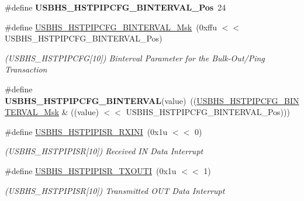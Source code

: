 \begin{DoxyCompactItemize}
\mbox{\label{group__SAME70__USBHS_ga296398192bdd3d809eaa7b87256f23de}} 
\#define {\bfseries U\+S\+B\+H\+S\+\_\+\+H\+S\+T\+P\+I\+P\+C\+F\+G\+\_\+\+B\+I\+N\+T\+E\+R\+V\+A\+L\+\_\+\+Pos}~24
\item 
\mbox{\label{group__SAME70__USBHS_gaedc9c4e67bfc7cc3d61e05ad12d33253}} 
\#define \mbox{\hyperlink{group__SAME70__USBHS_gaedc9c4e67bfc7cc3d61e05ad12d33253}{U\+S\+B\+H\+S\+\_\+\+H\+S\+T\+P\+I\+P\+C\+F\+G\+\_\+\+B\+I\+N\+T\+E\+R\+V\+A\+L\+\_\+\+Msk}}~(0xffu $<$$<$ U\+S\+B\+H\+S\+\_\+\+H\+S\+T\+P\+I\+P\+C\+F\+G\+\_\+\+B\+I\+N\+T\+E\+R\+V\+A\+L\+\_\+\+Pos)
\begin{DoxyCompactList}\small\item\em (U\+S\+B\+H\+S\+\_\+\+H\+S\+T\+P\+I\+P\+C\+FG\mbox{[}10\mbox{]}) Binterval Parameter for the Bulk-\/\+Out/\+Ping Transaction \end{DoxyCompactList}\item 
\mbox{\label{group__SAME70__USBHS_ga9dfcf332f4e592710da5e84377e52306}} 
\#define {\bfseries U\+S\+B\+H\+S\+\_\+\+H\+S\+T\+P\+I\+P\+C\+F\+G\+\_\+\+B\+I\+N\+T\+E\+R\+V\+AL}(value)~((\mbox{\hyperlink{group__SAMV71__USBHS_gaedc9c4e67bfc7cc3d61e05ad12d33253}{U\+S\+B\+H\+S\+\_\+\+H\+S\+T\+P\+I\+P\+C\+F\+G\+\_\+\+B\+I\+N\+T\+E\+R\+V\+A\+L\+\_\+\+Msk}} \& ((value) $<$$<$ U\+S\+B\+H\+S\+\_\+\+H\+S\+T\+P\+I\+P\+C\+F\+G\+\_\+\+B\+I\+N\+T\+E\+R\+V\+A\+L\+\_\+\+Pos)))
\item 
\mbox{\label{group__SAME70__USBHS_gabd4bff53529d3a63d2f2a6b288ea4404}} 
\#define \mbox{\hyperlink{group__SAME70__USBHS_gabd4bff53529d3a63d2f2a6b288ea4404}{U\+S\+B\+H\+S\+\_\+\+H\+S\+T\+P\+I\+P\+I\+S\+R\+\_\+\+R\+X\+I\+NI}}~(0x1u $<$$<$ 0)
\begin{DoxyCompactList}\small\item\em (U\+S\+B\+H\+S\+\_\+\+H\+S\+T\+P\+I\+P\+I\+SR\mbox{[}10\mbox{]}) Received IN Data Interrupt \end{DoxyCompactList}\item 
\mbox{\label{group__SAME70__USBHS_gab412d773f75086777987bce75d9c2c79}} 
\#define \mbox{\hyperlink{group__SAME70__USBHS_gab412d773f75086777987bce75d9c2c79}{U\+S\+B\+H\+S\+\_\+\+H\+S\+T\+P\+I\+P\+I\+S\+R\+\_\+\+T\+X\+O\+U\+TI}}~(0x1u $<$$<$ 1)
\begin{DoxyCompactList}\small\item\em (U\+S\+B\+H\+S\+\_\+\+H\+S\+T\+P\+I\+P\+I\+SR\mbox{[}10\mbox{]}) Transmitted O\+UT Data Interrupt \end{DoxyCompactList}\item 

\end{DoxyCompactItemize}
